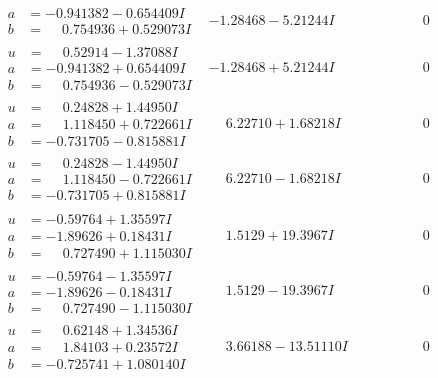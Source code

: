 \documentclass[1p]{elsarticle_modified}
\theoremstyle{definition}
\begin{document}
$$\begin{array}{c|c|c}
\begin{aligned}
a &= -0.941382 - 0.654409 I \\
b &= \phantom{-}0.754936 + 0.529073 I\end{aligned}
 & -1.28468 - 5.21244 I & \phantom{-0.000000 } 0 \\ \hline\begin{aligned}
u &= \phantom{-}0.52914 - 1.37088 I \\
a &= -0.941382 + 0.654409 I \\
b &= \phantom{-}0.754936 - 0.529073 I\end{aligned}
 & -1.28468 + 5.21244 I & \phantom{-0.000000 } 0 \\ \hline\begin{aligned}
u &= \phantom{-}0.24828 + 1.44950 I \\
a &= \phantom{-}1.118450 + 0.722661 I \\
b &= -0.731705 - 0.815881 I\end{aligned}
 & \phantom{-}6.22710 + 1.68218 I & \phantom{-0.000000 } 0 \\ \hline\begin{aligned}
u &= \phantom{-}0.24828 - 1.44950 I \\
a &= \phantom{-}1.118450 - 0.722661 I \\
b &= -0.731705 + 0.815881 I\end{aligned}
 & \phantom{-}6.22710 - 1.68218 I & \phantom{-0.000000 } 0 \\ \hline\begin{aligned}
u &= -0.59764 + 1.35597 I \\
a &= -1.89626 + 0.18431 I \\
b &= \phantom{-}0.727490 + 1.115030 I\end{aligned}
 & \phantom{-}1.5129 + 19.3967 I & \phantom{-0.000000 } 0 \\ \hline\begin{aligned}
u &= -0.59764 - 1.35597 I \\
a &= -1.89626 - 0.18431 I \\
b &= \phantom{-}0.727490 - 1.115030 I\end{aligned}
 & \phantom{-}1.5129 - 19.3967 I & \phantom{-0.000000 } 0 \\ \hline\begin{aligned}
u &= \phantom{-}0.62148 + 1.34536 I \\
a &= \phantom{-}1.84103 + 0.23572 I \\
b &= -0.725741 + 1.080140 I\end{aligned}
 & \phantom{-}3.66188 - 13.51110 I & \phantom{-0.000000 } 0\\

\end{array}$$
\end{document}
